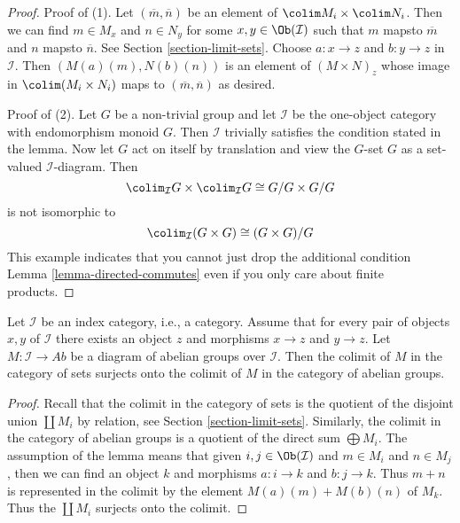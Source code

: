 \begin{proof}
Proof of (1). Let $(\overline{m}, \overline{n})$
be an element of $\colim M_i \times \colim N_i$.
Then we can find $m \in M_x$ and $n \in N_y$ for some
$x, y \in \Ob(\mathcal{I})$ such that $m$ mapsto
$\overline{m}$ and $n$ mapsto $\overline{n}$. See
Section \ref{section-limit-sets}.
Choose $a : x \to z$ and $b : y \to z$
in $\mathcal{I}$. Then $(M(a)(m), N(b)(n))$ is an element of
$(M \times N)_z$ whose image in $\colim (M_i \times N_i)$
maps to $(\overline{m}, \overline{n})$ as desired.

\medskip\noindent
Proof of (2). Let $G$ be a non-trivial group and
let $\mathcal{I}$ be the one-object category with endomorphism monoid $G$.
Then $\mathcal{I}$ trivially satisfies the condition stated in the lemma.
Now let $G$ act on itself by translation and view the $G$-set $G$
as a set-valued $\mathcal{I}$-diagram. Then
$$
\colim_\mathcal{I} G \times \colim_\mathcal{I} G \cong G/G \times G/G
$$
is not isomorphic to
$$
\colim_\mathcal{I} (G \times G) \cong (G \times G)/G
$$
This example indicates that you cannot just drop the additional
condition Lemma \ref{lemma-directed-commutes}
even if you only care about finite products.
\end{proof}

\begin{lemma}
\label{lemma-colimits-abelian-as-sets}
Let $\mathcal{I}$ be an index category, i.e., a category. Assume
that for every pair of objects $x, y$ of $\mathcal{I}$
there exists an object $z$ and morphisms $x \to z$ and $y \to z$.
Let $M : \mathcal{I} \to \textit{Ab}$ be a diagram of abelian
groups over $\mathcal{I}$. Then the colimit of $M$ in the category
of sets surjects onto the colimit of $M$ in the category of
abelian groups.
\end{lemma}

\begin{proof}
Recall that the colimit in the category of sets is the quotient of
the disjoint union $\coprod M_i$ by relation, see
Section \ref{section-limit-sets}.
Similarly, the colimit in the category of abelian groups is a quotient
of the direct sum $\bigoplus M_i$.
The assumption of the lemma means that given $i, j \in \Ob(\mathcal{I})$
and $m \in M_i$ and $n \in M_j$, then we can find an object
$k$ and morphisms $a : i \to k$ and $b : j \to k$.
Thus $m + n$ is represented in the colimit by the element
$M(a)(m) + M(b)(n)$ of $M_k$. Thus the $\coprod M_i$
surjects onto the colimit.
\end{proof}


